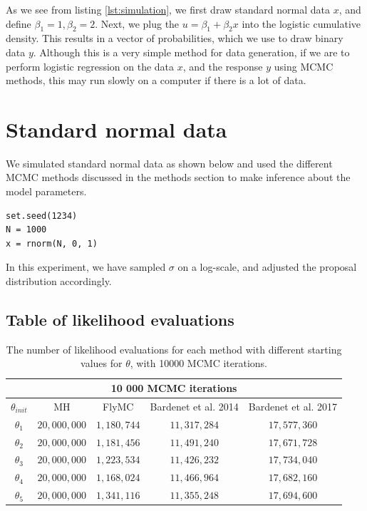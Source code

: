 As we see from listing \ref{lst:simulation}, we first draw standard normal data $x$, and define $\beta_1 = 1, \beta_2 = 2$. Next, we plug the  $u = \beta_1 + \beta_2 x$ into the logistic cumulative density. 
This results in a vector of probabilities, which we use to draw binary data $y$. Although this is a very simple method for data generation, if we are to perform logistic regression on the data $x$, and the response $y$ using MCMC methods, this may run slowly on a computer if there is a lot of data.


\section{Standard normal data}
We simulated standard normal data as shown below and used the different MCMC methods discussed in the methods section to make inference about the model parameters. 
\begin{lstlisting}[caption={simulation of standard normal data}, label={lst:sim_normal}]
set.seed(1234)
N = 1000
x = rnorm(N, 0, 1)
\end{lstlisting}
In this experiment, we have sampled $\sigma$ on a log-scale, and adjusted the proposal distribution accordingly. 
\subsection{Table of likelihood evaluations}
\begin{table}
    \centering
\begin{tabular}{|c|c|c|c|c|}
  \hline
    \multicolumn{5}{|c|}{10 000 MCMC iterations} \\
    \hline
\hline
        $\theta_{init}$ &  MH & FlyMC & Bardenet et al. 2014 & Bardenet et al. 2017\\ 
         \hline \hline$\theta_1$ & $20,000,000$ & $1,180,744$ & $11,317,284$ & $17,577,360$ \\
        $\theta_2$ & $20,000,000$ & $1,181,456$ & $11,491,240$ & $17,671,728$ \\
        $\theta_3$ & $20,000,000$ & $1,223,534$ & $11,426,232$ & $17,734,040$
        \\ $ \theta_4$ & $20,000,000$ & $1,168,024$ & $11,466,964$ & $17,682,160$ \\
        $\theta_5$ &$20,000,000$&$1,341,116$&$11,355,248$&$17,694,600$
        \\ \hline
\end{tabular}
\caption{The number of likelihood evaluations for each method with different starting values for $\theta$, with 10000 MCMC iterations.}
\label{tab:ll_evals_10k_normal}
\end{table} 

